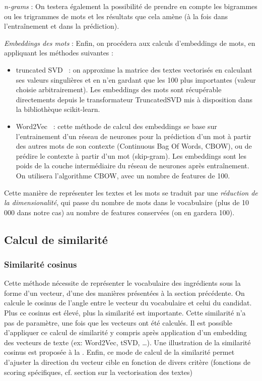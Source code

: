         \emph{n-grams} : 
        On testera également la possibilité de prendre en compte les bigrammes ou les trigrammes de mots et les résultats que cela amène (à la fois dans l'entraînement et dans la prédiction).

        \emph{Embeddings des mots} : 
        Enfin, on procédera aux calculs d'embeddings de mots, en appliquant les méthodes suivantes :
        \begin{itemize}
            \item truncated SVD~\cite{LSA_wiki} : on approxime la matrice des textes vectorisés en calculant ses valeurs singulières et en n'en gardant que les 100 plus importantes (valeur choisie arbitrairement). Les embeddings des mots sont récupérable directements depuis le transformateur TruncatedSVD mis à disposition dans la bibliothèque scikit-learn.
            \item Word2Vec~\cite{word2vec_wiki} : cette méthode de calcul des embeddings se base sur l'entrainement d'un réseau de neurones pour la prédiction d'un mot à partir des autres mots de son contexte (Continuous Bag Of Words, CBOW), ou de prédire le contexte à partir d'un mot (skip-gram). Les embeddings sont les poids de la couche intermédiaire du réseau de neurones après entraînement. On utilisera l'algorithme CBOW, avec un nombre de features de 100.
        \end{itemize}
        Cette manière de représenter les textes et les mots se traduit par une \emph{réduction de la dimensionalité}, qui passe du nombre de mots dans le vocabulaire (plus de 10 000 dans notre cas) au nombre de features conservées (on en gardera 100).

        \subsection{Calcul de similarité}

            \subsubsection{Similarité cosinus}
            \label{similarite_cosinus}

            Cette méthode nécessite de représenter le vocabulaire des ingrédients sous la forme d'un vecteur, d'une des manières présentées à la section précédente.
            On calcule le cosinus de l'angle entre le vecteur du vocabulaire et celui du candidat.
            Plus ce cosinus est élevé, plus la similarité est importante.
            Cette similarité n'a pas de paramètre, une fois que les vecteurs ont été calculés.
            Il est possible d'appliquer ce calcul de similarité y compris après application d'un embedding des vecteurs de texte (ex: Word2Vec, tSVD, \dots).
            Une illustration de la similarité cosinus est proposée à la .
            Enfin, ce mode de calcul de la similarité permet d'ajuster la direction du vecteur cible en fonction de divers critère (fonctions de scoring spécifiques, cf. section  sur la vectorisation des textes)

